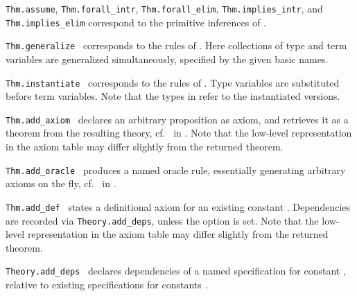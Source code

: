 \begin{isabellebody}
\begin{isamarkuptext}
\begin{description}
  \item \verb|Thm.assume|, \verb|Thm.forall_intr|, \verb|Thm.forall_elim|, \verb|Thm.implies_intr|, and \verb|Thm.implies_elim|
  correspond to the primitive inferences of .

  \item \verb|Thm.generalize|~
  corresponds to the  rules of
  .  Here collections of type and term
  variables are generalized simultaneously, specified by the given
  basic names.

  \item \verb|Thm.instantiate|~ corresponds to the  rules
  of .  Type variables are substituted before
  term variables.  Note that the types in 
  refer to the instantiated versions.

  \item \verb|Thm.add_axiom|~ declares an
  arbitrary proposition as axiom, and retrieves it as a theorem from
  the resulting theory, cf.\  in
  .  Note that the low-level representation in
  the axiom table may differ slightly from the returned theorem.

  \item \verb|Thm.add_oracle|~ produces a named
  oracle rule, essentially generating arbitrary axioms on the fly,
  cf.\  in .

  \item \verb|Thm.add_def|~ states a definitional axiom for an existing constant
  .  Dependencies are recorded via \verb|Theory.add_deps|,
  unless the  option is set.  Note that the
  low-level representation in the axiom table may differ slightly from
  the returned theorem.

  \item \verb|Theory.add_deps|~ declares dependencies of a named specification
  for constant , relative to existing
  specifications for constants .


\end{description}
\end{isamarkuptext}
\end{isabellebody}
